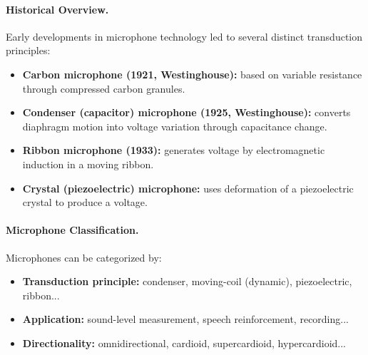 \paragraph{Historical Overview.}
Early developments in microphone technology led to several distinct transduction principles:
\begin{itemize}
  \item \textbf{Carbon microphone (1921, Westinghouse):} based on variable resistance through compressed carbon granules.
  \item \textbf{Condenser (capacitor) microphone (1925, Westinghouse):} converts diaphragm motion into voltage variation through capacitance change.
  \item \textbf{Ribbon microphone (1933):} generates voltage by electromagnetic induction in a moving ribbon.
  \item \textbf{Crystal (piezoelectric) microphone:} uses deformation of a piezoelectric crystal to produce a voltage.
\end{itemize}

\paragraph{Microphone Classification.}
Microphones can be categorized by:
\begin{itemize}
  \item \textbf{Transduction principle:} condenser, moving-coil (dynamic), piezoelectric, ribbon...
  \item \textbf{Application:} sound-level measurement, speech reinforcement, recording...
  \item \textbf{Directionality:} omnidirectional, cardioid, supercardioid, hypercardioid...
\end{itemize}

